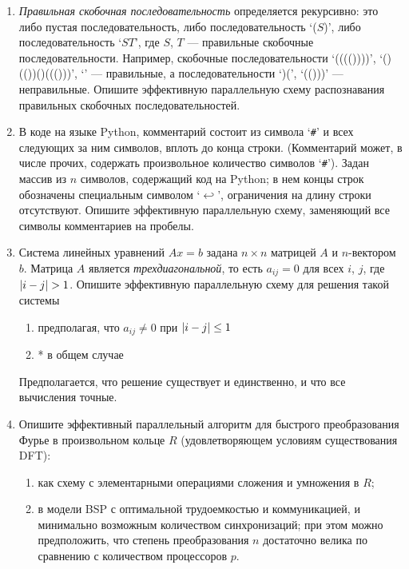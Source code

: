 \documentclass[11pt]{article}
\newenvironment{exercise}{\item}{}
\begin{document}
\begin{enumerate}
\begin{exercise}
\emph{Правильная скобочная последовательность} определяется рекурсивно:
это либо пустая последовательность, либо последовательность `($S$)', либо последовательность `$ST$',
где $S$, $T$ --- правильные скобочные последовательности.
Например, скобочные последовательности `(((())))', `()(())()((()))', `' --- правильные, 
а последовательности `)(', `(()))' --- неправильные. 
Опишите эффективную параллельную схему распознавания правильных скобочных последовательностей.
\end{exercise}


\begin{exercise}
В коде на языке Python, комментарий состоит из символа `\texttt{\#}' 
и всех следующих за ним символов, вплоть до конца строки.
(Комментарий может, в числе прочих, содержать произвольное количество символов `\texttt{\#}').
Задан массив из $n$ символов, содержащий код на Python;
в нем концы строк обозначены специальным символом `$\hookleftarrow$', 
ограничения на длину строки отсутствуют. 
Опишите эффективную параллельную схему, заменяющий все символы комментариев на пробелы.
\end{exercise}


\begin{exercise}
Система линейных уравнений $Ax = b$ задана $n \times n$ матрицей $A$ и $n$-вектором $b$.
Матрица $A$ является \emph{трехдиагональной}, то есть $a_{ij}=0$ для всех $i$, $j$, где $\lvert i-j\rvert>1$.
Опишите эффективную параллельную схему для решения такой системы
\begin{enumerate}
\item предполагая, что $a_{ij} \neq 0$ при $\lvert i-j\rvert \leq 1$
\item* в общем случае
\end{enumerate}
Предполагается, что решение существует и единственно, и что все вычисления точные.
\end{exercise}


\begin{exercise}
Опишите эффективный параллельный алгоритм для быстрого преобразования Фурье в произвольном кольце $R$
(удовлетворяющем условиям существования DFT):
%
\begin{enumerate}
%
\item как схему с элементарными операциями сложения и умножения в $R$;
%
\item в модели BSP с оптимальной трудоемкостью и коммуникацией, 
и минимально возможным количеством синхронизаций;
при этом можно предположить, что степень преобразования $n$ достаточно велика 
по сравнению с количеством процессоров $p$.
%
\end{enumerate}
\end{exercise}



\end{enumerate}
\end{document}
